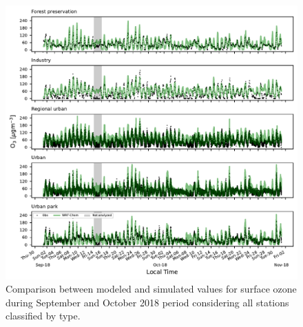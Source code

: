 \begin{figure}[!ht]
  \includegraphics[width=1\textwidth]{fig/Sep_Oct18_type_subplot_o3}
  \caption{Comparison between modeled and simulated values for surface ozone during September and October 2018 period considering all stations classified by type.}
  \label{fig:Sep_Oct18_type_o3}
\end{figure}

